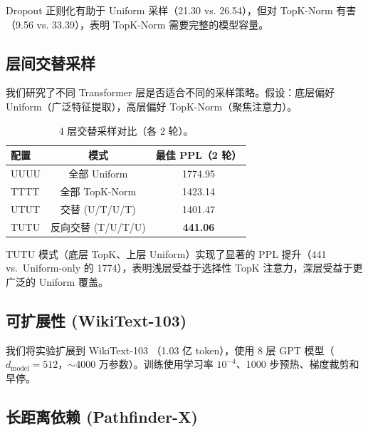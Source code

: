 \documentclass[11pt,a4paper,fontset=mac]{ctexart}
\begin{document}
Dropout 正则化有助于 Uniform 采样（21.30 vs. 26.54），但对 TopK-Norm 有害（9.56 vs. 33.39），表明 TopK-Norm 需要完整的模型容量。

\subsection{层间交替采样}

我们研究了不同 Transformer 层是否适合不同的采样策略。假设：底层偏好 Uniform（广泛特征提取），高层偏好 TopK-Norm（聚焦注意力）。

\begin{table}[h]
\centering
\caption{4 层交替采样对比（各 2 轮）。}
\label{tab:alternating}
\begin{tabular}{lcc}
\toprule
配置 & 模式 & 最佳 PPL（2 轮） \\
\midrule
UUUU & 全部 Uniform          & 1774.95 \\
TTTT & 全部 TopK-Norm        & 1423.14 \\
UTUT & 交替 (U/T/U/T)        & 1401.47 \\
TUTU & 反向交替 (T/U/T/U)    & \textbf{441.06} \\
\bottomrule
\end{tabular}
\end{table}

TUTU 模式（底层 TopK、上层 Uniform）实现了显著的 PPL 提升（441 vs.\ Uniform-only 的 1774），表明浅层受益于选择性 TopK 注意力，深层受益于更广泛的 Uniform 覆盖。

\subsection{可扩展性 (WikiText-103)}

我们将实验扩展到 WikiText-103 \cite{merity2016pointer}（1.03 亿 token），使用 8 层 GPT 模型（$d_{\text{model}}=512$，$\sim$4000 万参数）。训练使用学习率 $10^{-4}$、1000 步预热、梯度裁剪和早停。

\subsection{长距离依赖 (Pathfinder-X)}
\end{document}
